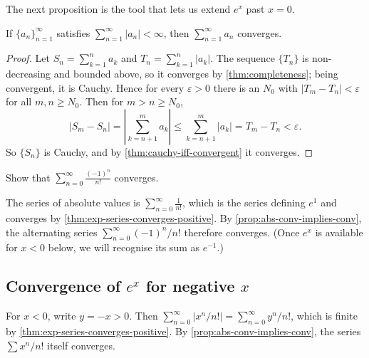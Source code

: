The next proposition is the tool that lets us extend \(e^{x}\) past \(x = 0\).

\begin{proposition}\label{prop:abs-conv-implies-conv}
If \(\{a_{n}\}_{n = 1}^{\infty}\) satisfies \(\sum_{n = 1}^{\infty} \lvert a_{n} \rvert < \infty\), then \(\sum_{n = 1}^{\infty} a_{n}\) converges.
\end{proposition}

\begin{proof}
Let \(S_{n} = \sum_{k = 1}^{n} a_{k}\) and \(T_{n} = \sum_{k = 1}^{n} \lvert a_{k} \rvert\). The sequence \(\{T_{n}\}\) is non-decreasing and bounded above, so it converges by \cref{thm:completeness}; being convergent, it is Cauchy. Hence for every \(\varepsilon > 0\) there is an \(N_{0}\) with \(\lvert T_{m} - T_{n} \rvert < \varepsilon\) for all \(m, n \ge N_{0}\). Then for \(m > n \ge N_{0}\),
\[
\lvert S_{m} - S_{n} \rvert = \left\lvert \sum_{k = n + 1}^{m} a_{k} \right\rvert \le \sum_{k = n + 1}^{m} \lvert a_{k} \rvert = T_{m} - T_{n} < \varepsilon.
\]
So \(\{S_{n}\}\) is Cauchy, and by \cref{thm:cauchy-iff-convergent} it converges.
\end{proof}

\begin{workedexample}
\begin{example}
Show that \(\displaystyle \sum_{n = 0}^{\infty} \frac{(-1)^{n}}{n!}\) converges.
\end{example}

\begin{solution}
The series of absolute values is \(\sum_{n = 0}^{\infty} \frac{1}{n!}\), which is the series defining \(e^{1}\) and converges by \cref{thm:exp-series-converges-positive}. By \cref{prop:abs-conv-implies-conv}, the alternating series \(\sum_{n = 0}^{\infty} (-1)^{n}/n!\) therefore converges. (Once \(e^{x}\) is available for \(x < 0\) below, we will recognise its sum as \(e^{-1}\).)
\end{solution}
\end{workedexample}

\subsection{Convergence of \(e^{x}\) for negative \(x\)}

For \(x < 0\), write \(y = -x > 0\). Then \(\sum_{n = 0}^{\infty} \lvert x^{n}/n! \rvert = \sum_{n = 0}^{\infty} y^{n}/n!\), which is finite by \cref{thm:exp-series-converges-positive}. By \cref{prop:abs-conv-implies-conv}, the series \(\sum x^{n}/n!\) itself converges.


